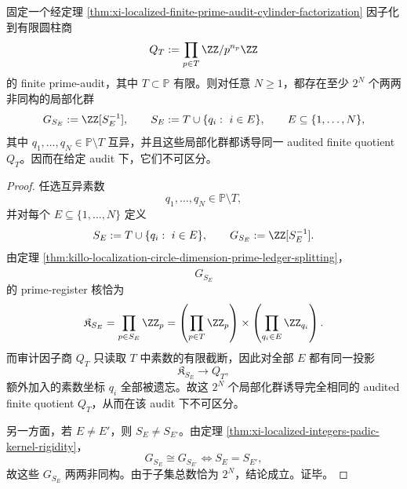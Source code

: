 \begin{corollary}\label{cor:xi-localized-finite-prime-audit-arbitrary-exponential-ambiguity}
固定一个经定理 \ref{thm:xi-localized-finite-prime-audit-cylinder-factorization} 因子化到有限圆柱商
\[
Q_T:=\prod_{p\in T}\ZZ/p^{n_p}\ZZ
\]
的 finite prime-audit，其中 \(T\subset\mathbb P\) 有限。则对任意 \(N\ge 1\)，都存在至少 \(2^N\) 个两两非同构的局部化群
\[
G_{S_E}:=\ZZ[S_E^{-1}],
\qquad
S_E:=T\cup\{q_i:\ i\in E\},
\qquad
E\subseteq\{1,\dots,N\},
\]
其中 \(q_1,\dots,q_N\in\mathbb P\setminus T\) 互异，并且这些局部化群都诱导同一 audited finite quotient \(Q_T\)。因而在给定 audit 下，它们不可区分。
\end{corollary}
\begin{proof}
任选互异素数
\[
q_1,\dots,q_N\in\mathbb P\setminus T,
\]
并对每个 \(E\subseteq\{1,\dots,N\}\) 定义
\[
S_E:=T\cup\{q_i:\ i\in E\},
\qquad
G_{S_E}:=\ZZ[S_E^{-1}].
\]
由定理 \ref{thm:killo-localization-circle-dimension-prime-ledger-splitting}，
\[
\widehat{G_{S_E}}
\]
的 prime-register 核恰为
\[
\mathfrak K_{S_E}=\prod_{p\in S_E}\ZZ_p
=
\left(\prod_{p\in T}\ZZ_p\right)\times
\left(\prod_{q_i\in E}\ZZ_{q_i}\right).
\]
而审计因子商 \(Q_T\) 只读取 \(T\) 中素数的有限截断，因此对全部 \(E\) 都有同一投影
\[
\mathfrak K_{S_E}\longrightarrow Q_T,
\]
额外加入的素数坐标 \(q_i\) 全部被遗忘。故这 \(2^N\) 个局部化群诱导完全相同的 audited finite quotient \(Q_T\)，从而在该 audit 下不可区分。

另一方面，若 \(E\neq E'\)，则 \(S_E\neq S_{E'}\)。由定理 \ref{thm:xi-localized-integers-padic-kernel-rigidity}，
\[
G_{S_E}\cong G_{S_{E'}}
\iff
S_E=S_{E'},
\]
故这些 \(G_{S_E}\) 两两非同构。由于子集总数恰为 \(2^N\)，结论成立。证毕。
\end{proof}

\endinput
